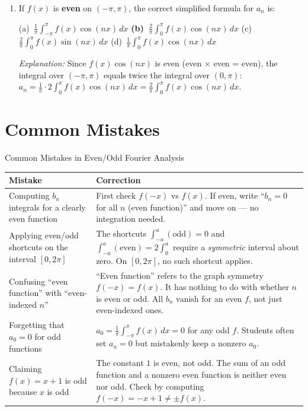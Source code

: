 \documentclass[12pt,a4paper]{article}
\begin{document}
\begin{enumerate}[label=\textbf{MCQ\arabic*.}]
\item If $f(x)$ is \textbf{even} on $(-\pi,\pi)$, the correct simplified formula for
  $a_n$ is:

  (a)\ $\displaystyle\frac{1}{\pi}\int_{-\pi}^{\pi}f(x)\cos(nx)\,dx$ \quad
  \textbf{(b)\ $\displaystyle\frac{2}{\pi}\int_{0}^{\pi}f(x)\cos(nx)\,dx$} \quad
  (c)\ $\displaystyle\frac{2}{\pi}\int_{0}^{\pi}f(x)\sin(nx)\,dx$ \quad
  (d)\ $\displaystyle\frac{1}{\pi}\int_{0}^{\pi}f(x)\cos(nx)\,dx$

  \textit{Explanation:} Since $f(x)\cos(nx)$ is even (even $\times$ even = even), the integral
  over $(-\pi,\pi)$ equals twice the integral over $(0,\pi)$:
  $a_n = \frac{1}{\pi}\cdot 2\int_{0}^{\pi}f(x)\cos(nx)\,dx = \frac{2}{\pi}\int_{0}^{\pi}f(x)\cos(nx)\,dx$.

\end{enumerate}

\section{Common Mistakes}

\begin{mistakebox}{Common Mistakes in Even/Odd Fourier Analysis}
\begin{tabular}{@{}p{7cm}p{8cm}@{}}
\toprule
\textbf{Mistake} & \textbf{Correction} \\
\midrule
Computing $b_n$ integrals for a clearly even function &
    First check $f(-x)$ vs $f(x)$. If even, write ``$b_n = 0$ for all $n$ (even function)''
    and move on --- no integration needed. \\[6pt]
Applying even/odd shortcuts on the interval $[0, 2\pi]$ &
    The shortcuts $\int_{-a}^{a}(\text{odd})=0$ and $\int_{-a}^{a}(\text{even})=2\int_0^a$
    require a \emph{symmetric} interval about zero. On $[0,2\pi]$, no such shortcut applies. \\[6pt]
Confusing ``even function'' with ``even-indexed $n$'' &
    ``Even function'' refers to the graph symmetry $f(-x)=f(x)$. It has nothing to do with
    whether $n$ is even or odd. All $b_n$ vanish for an even $f$, not just even-indexed ones. \\[6pt]
Forgetting that $a_0 = 0$ for odd functions &
    $a_0 = \frac{1}{\pi}\int_{-\pi}^{\pi}f(x)\,dx = 0$ for any odd $f$. Students often set
    $a_n = 0$ but mistakenly keep a nonzero $a_0$. \\[6pt]
Claiming $f(x) = x + 1$ is odd because $x$ is odd &
    The constant $1$ is even, not odd. The sum of an odd function and a nonzero even function
    is neither even nor odd. Check by computing $f(-x) = -x+1 \neq \pm f(x)$. \\
\bottomrule
\end{tabular}
\end{mistakebox}
\end{document}
